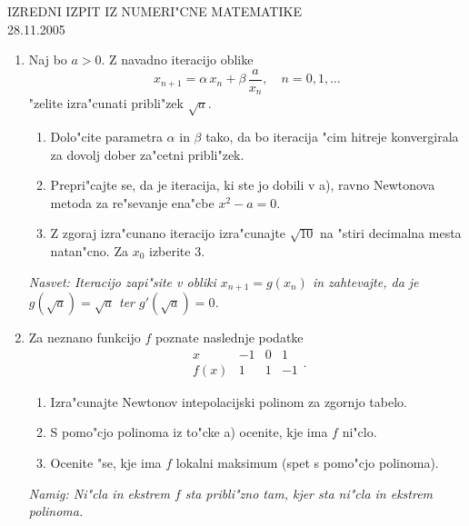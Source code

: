 

\begin{center}
  {\large IZREDNI IZPIT IZ NUMERI"CNE MATEMATIKE\\
    28.11.2005}
\end{center}
\vspace{1.5cm}
\begin{enumerate}
  \item Naj bo $a>0$. Z navadno iteracijo oblike
    $$x_{n+1}=\alpha\,x_n+\beta\,\frac{a}{x_n},\quad n=0,1,\dots$$
    "zelite izra"cunati pribli"zek $\sqrt{a}$. 

  \begin{enumerate}
    \item Dolo"cite parametra 
    $\alpha$ in $\beta$ tako, da bo iteracija "cim hitreje
    konvergirala za dovolj dober za"cetni pribli"zek.

    \item Prepri"cajte se, da je iteracija, ki ste jo dobili v a),
      ravno Newtonova metoda za re"sevanje ena"cbe $x^2-a=0$.

    \item Z zgoraj izra"cunano iteracijo izra"cunajte
      $\sqrt{10}$ na "stiri decimalna mesta natan"cno. Za $x_0$ izberite
      $3$.

  \end{enumerate}
  {\sl Nasvet: Iteracijo zapi"site v obliki $x_{n+1}=g(x_n)$ in
    zahtevajte, da je $g(\sqrt{a})=\sqrt{a}$ ter $g'(\sqrt{a})=0$.}
  \item Za neznano funkcijo $f$ poznate naslednje podatke
    $$
    \begin{array}{c|rrr}
      x& -1 & 0 & 1 \\ \hline
      f(x) & 1 & 1 & -1
    \end{array}.
    $$
      

  \begin{enumerate}
    \item Izra"cunajte Newtonov intepolacijski polinom 
      za zgornjo tabelo.

    \item S pomo"cjo polinoma iz to"cke a) ocenite, kje ima $f$ ni"clo. 

    \item Ocenite "se, kje ima $f$ lokalni maksimum (spet
      s pomo"cjo polinoma).

  \end{enumerate}
  {\sl Namig: Ni"cla in ekstrem $f$ sta pribli"zno tam, kjer sta 
    ni"cla in ekstrem polinoma.}
\end{enumerate}

